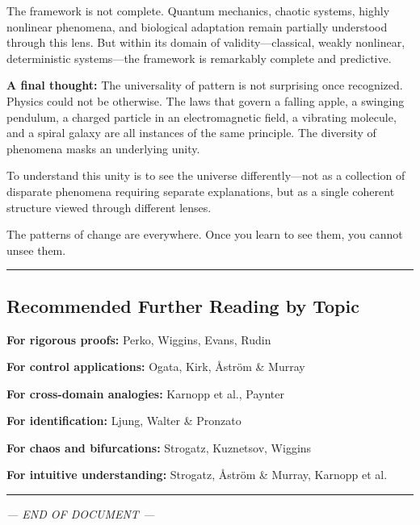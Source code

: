 \documentclass[
]{article}
\begin{document}
The framework is not complete. Quantum mechanics, chaotic systems,
highly nonlinear phenomena, and biological adaptation remain partially
understood through this lens. But within its domain of
validity---classical, weakly nonlinear, deterministic systems---the
framework is remarkably complete and predictive.

\textbf{A final thought:} The universality of pattern is not surprising
once recognized. Physics could not be otherwise. The laws that govern a
falling apple, a swinging pendulum, a charged particle in an
electromagnetic field, a vibrating molecule, and a spiral galaxy are all
instances of the same principle. The diversity of phenomena masks an
underlying unity.

To understand this unity is to see the universe differently---not as a
collection of disparate phenomena requiring separate explanations, but
as a single coherent structure viewed through different lenses.

The patterns of change are everywhere. Once you learn to see them, you
cannot unsee them.

\begin{center}\rule{0.5\linewidth}{0.5pt}\end{center}

\subsection{Recommended Further Reading by
Topic}\label{recommended-further-reading-by-topic}

\textbf{For rigorous proofs:} Perko, Wiggins, Evans, Rudin

\textbf{For control applications:} Ogata, Kirk, Åström \& Murray

\textbf{For cross-domain analogies:} Karnopp et al., Paynter

\textbf{For identification:} Ljung, Walter \& Pronzato

\textbf{For chaos and bifurcations:} Strogatz, Kuznetsov, Wiggins

\textbf{For intuitive understanding:} Strogatz, Åström \& Murray,
Karnopp et al.

\begin{center}\rule{0.5\linewidth}{0.5pt}\end{center}

\emph{--- END OF DOCUMENT ---}
\end{document}
